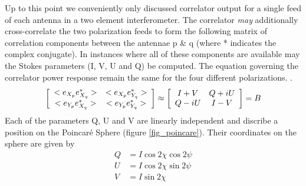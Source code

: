 \documentclass[a4paper,10pt]{report}
\begin{document}
Up to this point we conveniently only discussed correlator output for a single feed of each antenna in a two element interferometer. The correlator \textit{may} additionally cross-correlate the two polarization feeds to 
form the following matrix of correlation components between the antennae p \& q (where * indicates the complex conjugate). In instances where all of these components are available may the Stokes parameters (I, V, U and Q) be computed. 
The equation governing the correlator power response remain the same for the four different polarizations.  \cite{taylor1999synthesis}.
\begin{equation}
    \left[\begin{array}{c c}
     <e_{X_p}e_{X_q}^*> & <e_{X_p}e_{Y_q}^*> \\
     <e_{Y_p}e_{X_q}^*> & <e_{Y_p}e_{Y_q}^*> \\
    \end{array}\right] \approx 
    \left[\begin{array}{c c}
     I + V & Q + iU \\
     Q - iU & I - V \\
    \end{array}\right] = B
\end{equation}
Each of the parameters Q, U and V are linearly independent and discribe a position on the Poincar\'e Sphere (figure \ref{fig_poincare}). Their coordinates on the sphere are given by
\begin{equation}
  \begin{split}
    Q &= I\cos{2\chi}\cos{2\psi}\\
    U &= I\cos{2\chi}\sin{2\psi}\\
    V &= I\sin{2\chi}\\
  \end{split}
\end{equation}
\end{document}
